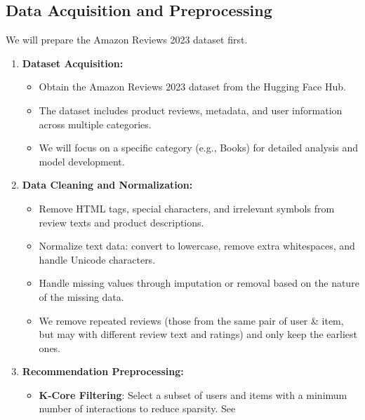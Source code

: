 \documentclass{article}
\begin{document}
\subsection{Data Acquisition and Preprocessing}
We will prepare the Amazon Reviews 2023 dataset first.
\begin{enumerate}
      \item \textbf{Dataset Acquisition:}
            \begin{itemize}
                  \item Obtain the Amazon Reviews 2023 dataset from the Hugging
                        Face Hub.
                  \item The dataset includes product reviews, metadata, and
                        user
                        information across multiple categories.
                  \item We will focus on a specific category (e.g., Books) for
                        detailed
                        analysis and model development.
            \end{itemize}

      \item \textbf{Data Cleaning and Normalization:}
            \begin{itemize}
                  \item Remove HTML tags, special characters, and irrelevant
                        symbols from
                        review texts and product descriptions.
                  \item Normalize text data: convert to lowercase, remove extra
                        whitespaces, and handle Unicode characters.
                  \item Handle missing values through imputation or removal
                        based
                        on the
                        nature of the missing data.
                  \item We remove repeated reviews (those from the same pair of
                        user \&
                        item, but may with different review text and ratings)
                        and
                        only keep the
                        earliest ones.

            \end{itemize}

      \item \textbf{Recommendation Preprocessing:}
            \begin{itemize}
                  \item \textbf{K-Core Filtering}: Select a subset of users and
                        items with a minimum number of interactions to reduce
                        sparsity. See


\end{itemize}
\end{enumerate}
\end{document}
